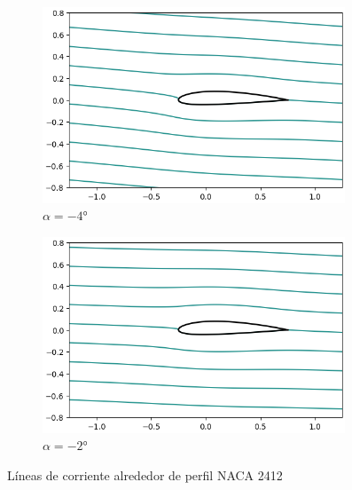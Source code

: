 \documentclass[letterpaper, openright, 12pt]{book}
\begin{document}
    \begin{figure}[htbp!]
        \centering
        \begin{subfigure}[c]{0.48\textwidth}
            \includegraphics[keepaspectratio, width=0.99\textwidth]
                {./img/potential_flow_2412_stream_-4}
            \caption{$\alpha = -4\si{\degree}$}
            \label{fig:potential_flow_2412_cp-4}
        \end{subfigure}
        \hfill
        \begin{subfigure}[c]{0.48\textwidth}
            \includegraphics[keepaspectratio, width=0.99\textwidth]
                {./img/potential_flow_2412_stream_-2}
            \caption{$\alpha = -2\si{\degree}$}
            \label{fig:potential_flow_2412_stream_-2}
        \end{subfigure}
        \caption{Líneas de corriente alrededor de perfil NACA 2412}
        \label{fig:potential_flow_2412_stream__0}
    \end{figure}
\end{document}
